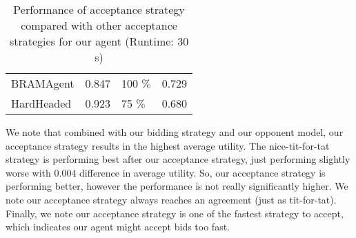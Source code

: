 \begin{table}[H]
\begin{tabular}{m{4.0cm}m{3.0cm}m{3.0cm}m{3.0cm}}
  BRAMAgent                     & 0.847                                                                 & 100 $\%$                                                             & 0.729                                                       \\ 
  HardHeaded                    & 0.923                                                                 & 75 $\%$                                                              & 0.680                                                      
  \\
  \bottomrule
\end{tabular}
\caption{Performance of acceptance strategy compared with other acceptance strategies for our agent (Runtime: $30$s) \label{table:as-results}}
\end{table}

We note that combined with our bidding strategy and our opponent model, our acceptance strategy results in the highest average utility.
The nice-tit-for-tat strategy is performing best after our acceptance strategy, just performing slightly worse with $0.004$ difference in average utility.
So, our acceptance strategy is performing better, however the performance is not really significantly higher.
We note our acceptance strategy always reaches an agreement (just as tit-for-tat).
Finally, we note our acceptance strategy is one of the fastest strategy to accept, which indicates our agent might accept bids too fast.

